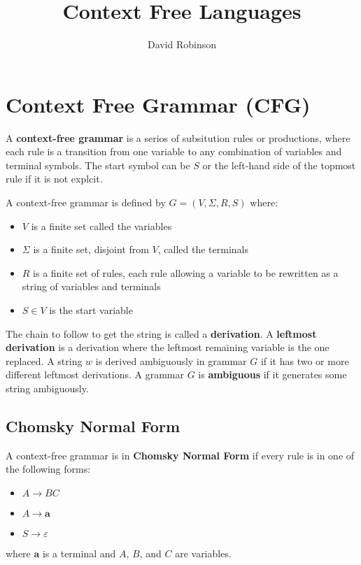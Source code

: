 \documentclass{article}
\title{Context Free Languages}
\author{David Robinson}
\date{}
\begin{document}
\maketitle

\section*{Context Free Grammar (CFG)}

A \textbf{context-free grammar} is a serios of subsitution rules or productions, where each rule is a transition from one variable to any combination of variables and terminal symbols. The start symbol can be $S$ or the left-hand side of the topmost rule if it is not explcit.
\vspace{1em}

A context-free grammar is defined by $G=(V,\Sigma, R, S)$ where:
\begin{itemize}
    \item $V$ is a finite set called the variables
    \item $\Sigma$ is a finite set, disjoint from $V$, called the terminals
    \item $R$ is a finite set of rules, each rule allowing a variable to be rewritten as a string of variables and terminals
    \item $S\in V$ is the start variable
\end{itemize}

The chain to follow to get the string is called a \textbf{derivation}. A \textbf{leftmost derivation} is a derivation where the leftmost remaining variable is the one replaced. A string $w$ is derived ambiguously in grammar $G$ if it has two or more different leftmost derivations. A grammar $G$ is \textbf{ambiguous} if it generates some string ambiguously.

\subsection*{Chomsky Normal Form}

A context-free grammar is in \textbf{Chomsky Normal Form} if every rule is in one of the following forms:
\begin{itemize}
    \item $A\rightarrow BC$
    \item $A\rightarrow\mathbf{a}$
    \item $S\rightarrow\varepsilon$
\end{itemize}
where $\mathbf{a}$ is a terminal and $A$, $B$, and $C$ are variables.
\end{document}

